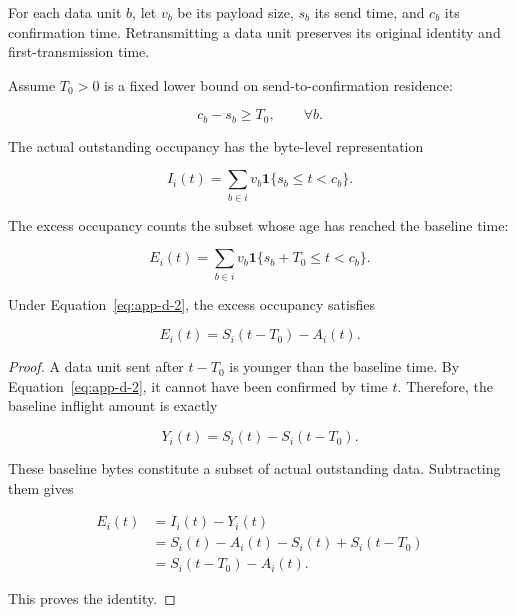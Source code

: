 For each data unit \(b\), let \(v_b\) be its payload size, \(s_b\) its send time, and \(c_b\) its confirmation time. Retransmitting a data unit preserves its original identity and first-transmission time.

Assume \(T_0>0\) is a fixed lower bound on send-to-confirmation residence:

\begin{equation}
\label{eq:app-d-2}
c_b-s_b\ge T_0,\qquad \forall b.
\end{equation}

The actual outstanding occupancy has the byte-level representation

\begin{equation}
\label{eq:app-d-3}
I_i(t)=
\sum_{b\in i}v_b\mathbf 1\{s_b\le t<c_b\}.
\end{equation}

The excess occupancy counts the subset whose age has reached the baseline time:

\begin{equation}
\label{eq:app-d-4}
E_i(t)=
\sum_{b\in i}v_b
\mathbf 1\{s_b+T_0\le t<c_b\}.
\end{equation}

\begin{lemma}
\label{lem:d-1}
Under Equation~\eqref{eq:app-d-2}, the excess occupancy satisfies

\begin{equation}
\label{eq:app-d-5}
\boxed{
E_i(t)=S_i(t-T_0)-A_i(t).
}
\end{equation}
\end{lemma}

\begin{proof} A data unit sent after \(t-T_0\) is younger than the baseline time. By Equation~\eqref{eq:app-d-2}, it cannot have been confirmed by time \(t\). Therefore, the baseline inflight amount is exactly

\begin{equation}
\label{eq:app-d-6}
Y_i(t)=S_i(t)-S_i(t-T_0).
\end{equation}

These baseline bytes constitute a subset of actual outstanding data. Subtracting them gives

\[
\begin{aligned}
E_i(t)
&=I_i(t)-Y_i(t)\\
&=S_i(t)-A_i(t)
 -S_i(t)+S_i(t-T_0)\\
&=S_i(t-T_0)-A_i(t).
\end{aligned}
\]

This proves the identity.
\end{proof}

